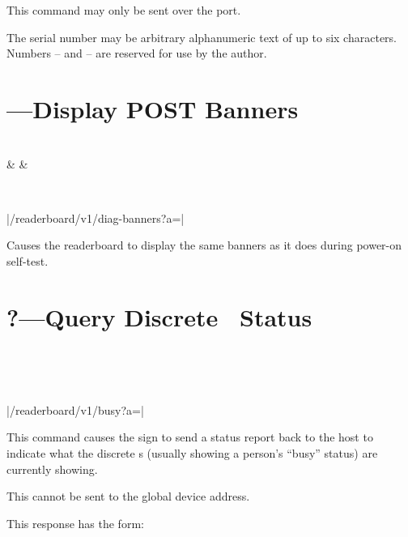 This command may only be sent over the  port.

The serial number may be arbitrary alphanumeric text of up to six characters.
Numbers -- and -- are reserved for use by the author.

\section{\z{=*=}---Display POST Banners}
\begin{center}
\begin{bytefield}[endianness=little,bitwidth=0.11111\textwidth]{8}
	 \\
	 &
	 &
\end{bytefield}
\\
\begin{Coding}
	|/readerboard/v1/diag-banners?a=|
\end{Coding}
\end{center}

Causes the readerboard to display the same banners as it does during power-on self-test.

\section{\z?---Query Discrete \led\ Status}
\begin{center}
\begin{bytefield}[endianness=little,bitwidth=0.11111\textwidth]{1}
	 \\
\end{bytefield}
\\
\begin{Coding}
	|/readerboard/v1/busy?a=|
\end{Coding}
\end{center}

This command causes the sign to send a status report back to the host to indicate
what the discrete \led s (usually showing a person's ``busy'' status) are currently showing. 

This cannot be sent to the global device address.

This response has the form:

\medskip

